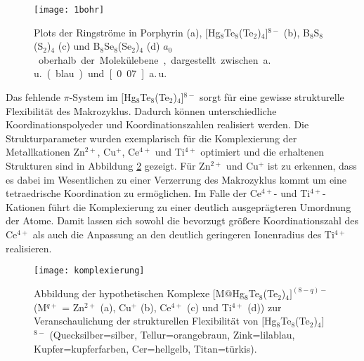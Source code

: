  

\begin{figure}[ht!]
	\centering
	\texttt{[image: 1bohr]}
	\captionsetup{figurewithin = chapter}
	\captionsetup{font=small, labelfont=bf}\caption[{Porphyrin, $[$Hg$_8$Te$_8$(Te$_2$)$_4$]$^{8-}$, B$_8$S$_8$(S$_2$)$_4$ und B$_8$Se$_8$(Se$_2$)$_4$: Plots der Ringströme}]{Plots der Ringströme in Porphyrin \textsf{(a)}, $[$Hg$_8$Te$_8$(Te$_2$)$_4$]$^{8-}$ \textsf{(b)}, B$_8$S$_8$(S$_2$)$_4$ \textsf{(c)} und B$_8$Se$_8$(Se$_2$)$_4$ \textsf{(d)} \unit[1]{$a_0$} oberhalb der Molekülebene, dargestellt zwischen \unit[0]{a.\,u.} (blau) und \unit[0.07]{a.\,u.}}
\label{abb:lic}
\end{figure}

\FloatBarrier
Das fehlende $\pi$-System im $[$Hg$_8$Te$_8$(Te$_2$)$_4$]$^{8-}$ sorgt für eine gewisse strukturelle Flexibilität des Makrozyklus. Dadurch können unterschiedliche Koordinationspolyeder und Koordinationszahlen realisiert werden. Die Strukturparameter wurden exemplarisch für die Komplexierung der Metallkationen Zn$^{2+}$, Cu$^+$, Ce$^{4+}$ und Ti$^{4+}$ optimiert und die erhaltenen Strukturen sind in Abbildung \ref{abb:komplexierung} gezeigt. Für Zn$^{2+}$ und Cu$^+$ ist zu erkennen, dass es dabei im Wesentlichen zu einer Verzerrung des Makrozyklus kommt um eine tetraedrische Koordination zu ermöglichen. Im Falle der Ce$^{4+}$- und Ti$^{4+}$-Kationen führt die Komplexierung zu einer deutlich ausgeprägteren Umordnung der Atome. Damit lassen sich sowohl die bevorzugt größere Koordinationszahl des Ce$^{4+}$ als auch die Anpassung an den deutlich geringeren Ionenradius des Ti$^{4+}$ realisieren.

\begin{figure}[ht!]
	\centering
	\texttt{[image: komplexierung]}
	\captionsetup{figurewithin = chapter}
	\captionsetup{font=small, labelfont=bf}\caption[{Abbildungen der hypothetischen Komplexe [M@Hg$_8$Te$_8$(Te$_2$)$_4]^{(8-q)-}$ (M$^{q+}$ = Zn$^{2+}$, Cu$^+$ , Ce$^{4+}$ und Ti$^{4+}$)}]{{Abbildung der hypothetischen Komplexe [M@Hg$_8$Te$_8$(Te$_2$)$_4]^{(8-q)-}$ (M$^{q+}$ = Zn$^{2+}$ \textsf{(a)}, Cu$^+$ \textsf{(b)}, Ce$^{4+}$ \textsf{(c)} und Ti$^{4+}$ \textsf{(d)})} zur Veranschaulichung der strukturellen Flexibilität von $[$Hg$_8$Te$_8$(Te$_2$)$_4$]$^{8-}$ (Quecksilber=silber, Tellur=orangebraun, Zink=lilablau, Kupfer=kupferfarben, Cer=hellgelb, Titan=türkis). }
\label{abb:komplexierung}
\end{figure}

